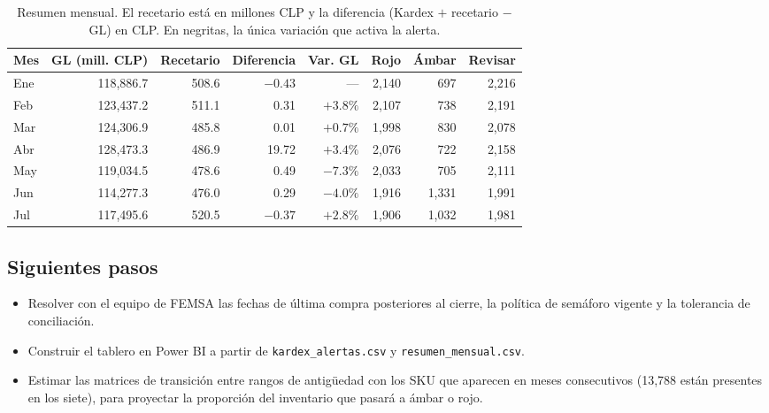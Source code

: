\documentclass[11pt,letterpaper]{article}
\begin{document}
\begin{table}[h]
\centering\small
\begin{tabular}{@{}lrrrrrrr@{}}
\toprule
Mes & GL (mill. CLP) & Recetario & Diferencia & Var. GL & Rojo & Ámbar & Revisar \\
\midrule
Ene & 118,886.7 & 508.6 & $-0.43$ & --- & 2,140 & 697 & 2,216 \\
Feb & 123,437.2 & 511.1 & 0.31 & $+3.8\%$ & 2,107 & 738 & 2,191 \\
Mar & 124,306.9 & 485.8 & 0.01 & $+0.7\%$ & 1,998 & 830 & 2,078 \\
Abr & 128,473.3 & 486.9 & 19.72 & $+3.4\%$ & 2,076 & 722 & 2,158 \\
May & 119,034.5 & 478.6 & 0.49 & $\mathbf{-7.3\%}$ & 2,033 & 705 & 2,111 \\
Jun & 114,277.3 & 476.0 & 0.29 & $-4.0\%$ & 1,916 & 1,331 & 1,991 \\
Jul & 117,495.6 & 520.5 & $-0.37$ & $+2.8\%$ & 1,906 & 1,032 & 1,981 \\
\bottomrule
\end{tabular}
\caption{Resumen mensual. El recetario está en millones CLP y la diferencia (Kardex $+$ recetario $-$ GL) en CLP. En negritas, la única variación que activa la alerta.}
\label{tab:mensual}
\end{table}

\subsection{Siguientes pasos}

\begin{itemize}
  \item Resolver con el equipo de FEMSA las fechas de última compra posteriores al cierre, la política de semáforo vigente y la tolerancia de conciliación.
  \item Construir el tablero en Power BI a partir de \texttt{kardex\_alertas.csv} y \texttt{resumen\_mensual.csv}.
  \item Estimar las matrices de transición entre rangos de antigüedad con los SKU que aparecen en meses consecutivos (13,788 están presentes en los siete), para proyectar la proporción del inventario que pasará a ámbar o rojo.
\end{itemize}
\end{document}
